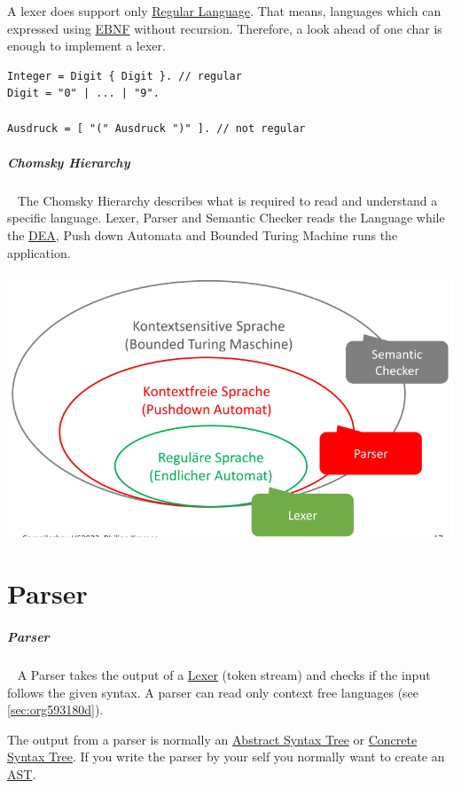 \documentclass[11pt,twoside,landscape]{article}
\begin{document}
\begin{multicols}{3}
A lexer does support only \href{../../../roam/20221228124714-regular_language.org}{Regular Language}.
That means, languages which can expressed using \href{../../../roam/20221228120443-how_do_you_specify_the_syntax_of_a_language.org}{EBNF} without recursion.
Therefore, a look ahead of one char is enough to implement a lexer.

\begin{verbatim}
Integer = Digit { Digit }. // regular
Digit = "0" | ... | "9".

Ausdruck = [ "(" Ausdruck ")" ]. // not regular
\end{verbatim}
\subparagraph{Chomsky Hierarchy} \
\label{sec:org593180d}
The Chomsky Hierarchy describes what is required to read and understand a specific language.
Lexer, Parser and Semantic Checker reads the Language while the \href{../../../roam/20211109182310-deterministic_finite_automaton.org}{DEA}, Push down Automata and Bounded Turing Machine runs the application.

{
\begin{center}
\includegraphics[width=.9\linewidth]{img/chomsky_hierarchie.png}
\end{center}
\label{fig:chomsky-hierarchy}
}

\section{Parser}
\label{sec:org9268a06}
\subparagraph{Parser} \
\label{sec:org5fa0550}
A Parser takes the output of a \href{../../../roam/20221228115248-what_is_a_lexer.org}{Lexer} (token stream) and checks if the input follows the given syntax.
A parser can read only context free languages (see \ref{sec:org593180d}).

The output from a parser is normally an \href{../../../roam/20221228141024-what_is_a_abstract_syntax_tree.org}{Abstract Syntax Tree} or \href{../../../roam/20221228140533-what_is_a_parse_tree.org}{Concrete Syntax Tree}.
If you write the parser by your self you normally want to create an \href{../../../roam/20221228141024-what_is_a_abstract_syntax_tree.org}{AST}.


\end{multicols}
\end{document}
